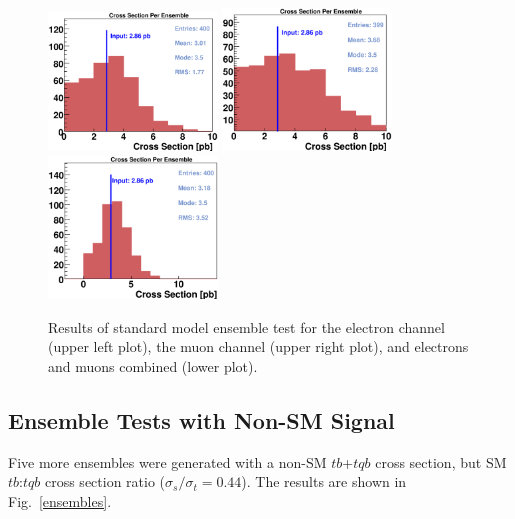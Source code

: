 \vspace{0.1in}
\begin{figure}[!h!tbp]
\includegraphics[width=0.40\textwidth]
{figures/ensembles/Ensembles_Electron}
\includegraphics[width=0.40\textwidth]
{figures/ensembles/Ensembles_Muon}
\includegraphics[width=0.40\textwidth]
{figures/ensembles/Ensembles}
\vspace{-0.1in}
\caption[SMens]{Results of standard model ensemble test for the
electron channel (upper left plot), the muon channel (upper right
plot), and electrons and muons combined (lower plot).}
\label{SMens}
\end{figure}

\clearpage

\subsection{Ensemble Tests with Non-SM Signal}
\label{ens_nonSM_sig}

Five more ensembles were generated with a non-SM $tb$+$tqb$ cross
section, but SM $tb$:$tqb$ cross section ratio ($\sigma_s/\sigma_t =
0.44$). The results are shown in Fig.~\ref{ensembles}.

